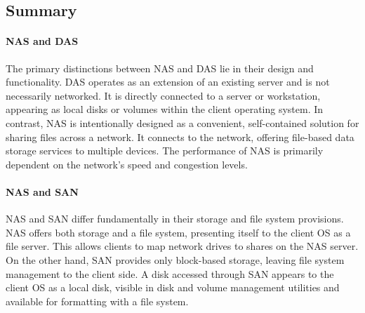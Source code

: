 \subsection{Summary}
\paragraph*{NAS and DAS}
The primary distinctions between NAS and DAS lie in their design and functionality. 
DAS operates as an extension of an existing server and is not necessarily networked. 
It is directly connected to a server or workstation, appearing as local disks or volumes within the client operating system. 
In contrast, NAS is intentionally designed as a convenient, self-contained solution for sharing files across a network. It connects to the network, offering file-based data storage services to multiple devices. 
The performance of NAS is primarily dependent on the network's speed and congestion levels.

\paragraph*{NAS and SAN}
NAS and SAN differ fundamentally in their storage and file system provisions. 
NAS offers both storage and a file system, presenting itself to the client OS as a file server. 
This allows clients to map network drives to shares on the NAS server. On the other hand, SAN provides only block-based storage, leaving file system management to the client side. 
A disk accessed through SAN appears to the client OS as a local disk, visible in disk and volume management utilities and available for formatting with a file system.

